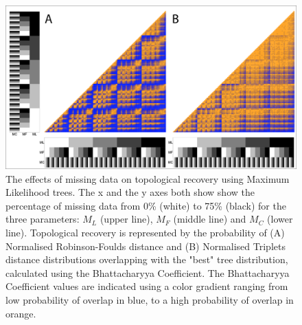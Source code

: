 \begin{figure} 
\centering
    \includegraphics[width=1\textwidth]{SupplementaryFigures/PairwiseComp-ML-RF+Tr-colour.png} %
    \caption{The effects of missing data on topological recovery using Maximum Likelihood trees. The x and the y axes both show show the percentage of missing data from 0\% (white) to 75\% (black) for the three parameters: $M_{L}$ (upper line), $M_{F}$ (middle line) and $M_{C}$ (lower line). Topological recovery is represented by the probability of (A) Normalised Robinson-Foulds distance and (B) Normalised Triplets distance distributions overlapping with the "best" tree distribution, calculated using the Bhattacharyya Coefficient. The Bhattacharyya Coefficient values are indicated using a color gradient ranging from low probability of overlap in blue, to a high probability of overlap in orange.}
\label{Fig_Supp_paircomp_ML}
\end{figure} 

